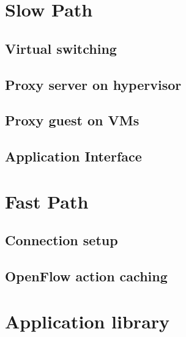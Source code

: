 



\section{Slow Path}
\subsection{Virtual switching}
\subsection{Proxy server on hypervisor}
\subsection{Proxy guest on VMs}
\subsection{Application Interface}

\section{Fast Path}
\subsection{Connection setup}
\subsection{OpenFlow action caching}

\section{Application library}